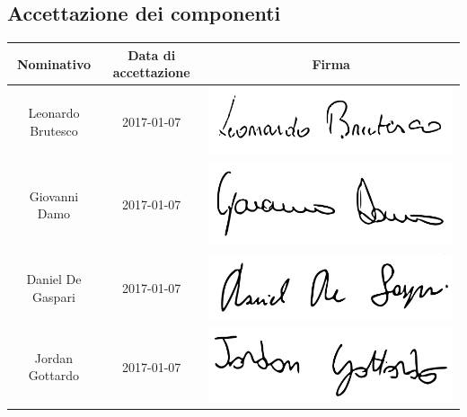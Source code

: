\subsection{Accettazione dei componenti}
\begin{table}[H]
		\begin{center}
		\begin{tabular}{ccc}
			\toprule
			\textbf{Nominativo} & \textbf{Data di accettazione} & \textbf{Firma} \\
			\midrule
			Leonardo Brutesco	&	2017-01-07	& \includegraphics[scale=0.10]{./img/Firme/leonardo.png} \\
			\midrule
			Giovanni Damo 		&	2017-01-07	& \includegraphics[scale=0.10]{./img/Firme/giovannid.png} \\
			\midrule
			Daniel De Gaspari 	&	2017-01-07	& \includegraphics[scale=0.10]{./img/Firme/daniel.png} \\
			\midrule
			Jordan Gottardo 	&	2017-01-07	& \includegraphics[scale=0.10]{./img/Firme/jordan.png} \\

\end{tabular}
\end{center}
\end{table}
